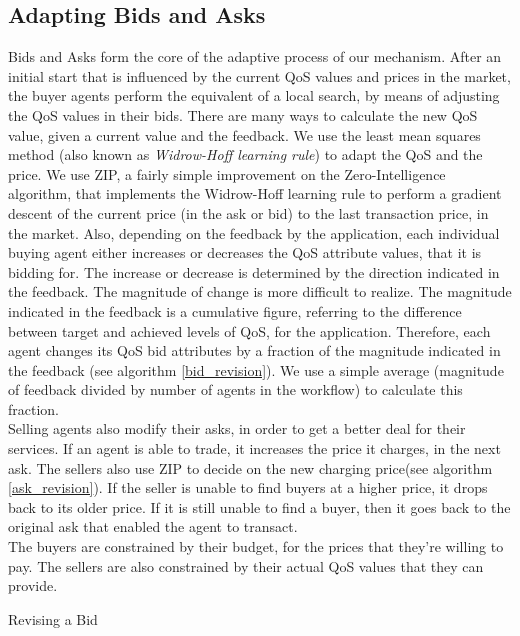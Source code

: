 \documentclass[10pt,journal,compsoc]{IEEEtran}
\begin{document}
\subsection{Adapting Bids and Asks}
Bids and Asks form the core of the adaptive process of our mechanism. After an initial start that is influenced by the current QoS values and prices in the market, the buyer agents perform the equivalent of a local search, by means of adjusting the QoS values in their bids. There are many ways to calculate the new QoS value, given a current value and the feedback. We use the least mean squares method (also known as \textit{Widrow-Hoff learning rule})\cite{Haykin2003Least} to adapt the QoS and the price. We use ZIP\cite{Cliff1998Simple}, a fairly simple improvement on the Zero-Intelligence algorithm, that implements the Widrow-Hoff learning rule to perform a gradient descent of the current price (in the ask or bid) to the last transaction price, in the market.  Also, depending on the feedback by the application, each individual buying agent either increases or decreases the QoS attribute values, that it is bidding for. The increase or decrease is determined by the direction indicated in the feedback. The magnitude of change is more difficult to realize. The magnitude indicated in the feedback is a cumulative figure, referring to the difference between target and achieved levels of QoS, for the application. Therefore, each agent changes its QoS bid attributes by a fraction of the magnitude indicated in the feedback (see algorithm \ref{bid_revision}). We use a simple average (magnitude of feedback divided by number of agents in the workflow) to calculate this fraction.\\
Selling agents also modify their asks, in order to get a better deal for their services. If an agent is able to trade, it increases the price it charges, in the next ask. The sellers also use ZIP to decide on the new charging price(see algorithm \ref{ask_revision}). If the seller is unable to find buyers at a higher price, it drops back to its older price. If it is still unable to find a buyer, then it goes back to the original ask that enabled the agent to transact.\\
The buyers are constrained by their budget, for the prices that they're willing to pay. The sellers are also constrained by their actual QoS values that they can provide.
 
 \begin{algorithm}
 \DontPrintSemicolon
  \caption{Revising a Bid}
  \label{bid_revision}   
 \end{algorithm}
\end{document}
